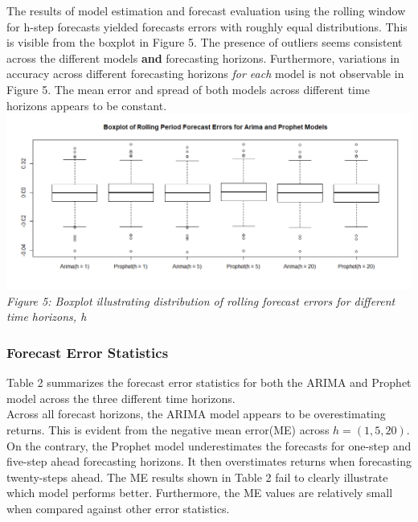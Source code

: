 \documentclass[12pt,a4paper]{article}
\numberwithin{equation}{section}
\numberwithin{figure}{section}
\numberwithin{table}{section}
\begin{document}
The results of model estimation and forecast evaluation using the
rolling window for h-step forecasts yielded forecasts errors with
roughly equal distributions. This is visible from the boxplot in Figure
5. The presence of outliers seems consistent across the different models
\textbf{and} forecasting horizons. Furthermore, variations in accuracy
across different forecasting horizons \emph{for each} model is not
observable in Figure 5. The mean error and spread of both models across
different time horizons appears to be constant.
\includegraphics[width=1.05000\textwidth]{Forecast error boxplot.png}\\
\emph{Figure 5: Boxplot illustrating distribution of rolling forecast
errors for different time horizons, h}

\subsubsection{Forecast Error
Statistics}\label{forecast-error-statistics}

Table 2 summarizes the forecast error statistics for both the ARIMA and
Prophet model across the three different time horizons.\\
Across all forecast horizons, the ARIMA model appears to be
overestimating returns. This is evident from the negative mean error(ME)
across \(h = (1,5,20)\). On the contrary, the Prophet model
underestimates the forecasts for one-step and five-step ahead
forecasting horizons. It then overstimates returns when forecasting
twenty-steps ahead. The ME results shown in Table 2 fail to clearly
illustrate which model performs better. Furthermore, the ME values are
relatively small when compared against other error statistics.
\end{document}
